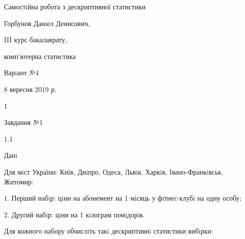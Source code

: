 \documentclass[a4paper,portrait,12pt]{article}
\begin{document}
\begin{flushleft}
Самостiйна робота з дескриптивної статистики
\end{flushleft}


\begin{flushleft}
Горбунов Данiел Денисович,
\end{flushleft}


\begin{flushleft}
III курс бакалаврату,
\end{flushleft}


\begin{flushleft}
комп'ютерна статистика
\end{flushleft}


\begin{flushleft}
Варiант №4
\end{flushleft}


\begin{flushleft}
8 вересня 2019 р.
\end{flushleft}





1





\begin{flushleft}
Завдання №1
\end{flushleft}





1.1





\begin{flushleft}
Данi
\end{flushleft}





\begin{flushleft}
Для мiст України: Київ, Днiпро, Одеса, Львiв, Харкiв, Iвано-Франкiвськ, Житомир:
\end{flushleft}


\begin{flushleft}
1. Перший набiр: цiни на абонемент на 1 мiсяць у фiтнес-клубi на одну особу;
\end{flushleft}


\begin{flushleft}
2. Другий набiр: цiни на 1 кiлограм помiдорiв.
\end{flushleft}


\begin{flushleft}
Для кожного набору обчислiть такi дескриптивнi статистики вибiрки:
\end{flushleft}
\end{document}
